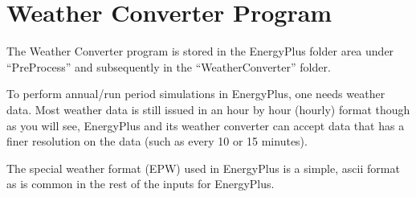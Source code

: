 \chapter{Weather Converter Program}\label{weather-converter-program}

The Weather Converter program is stored in the EnergyPlus folder area under ``PreProcess'' and subsequently in the ``WeatherConverter'' folder.

To perform annual/run period simulations in EnergyPlus, one needs weather data. Most weather data is still issued in an hour by hour (hourly) format though as you will see, EnergyPlus and its weather converter can accept data that has a finer resolution on the data (such as every 10 or 15 minutes).

The special weather format (EPW) used in EnergyPlus is a simple, ascii format as is common in the rest of the inputs for EnergyPlus.
